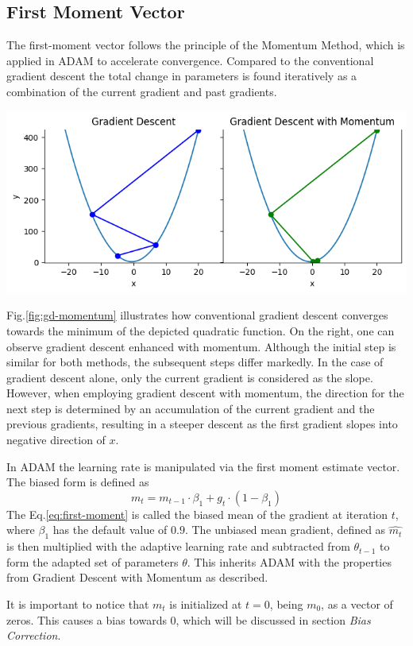 \documentclass[oneside]{article}
\begin{document}
\subsection{First Moment Vector}
The first-moment vector follows the principle of the Momentum Method, which is applied in ADAM to accelerate convergence. Compared to the conventional gradient descent the total change in parameters is found iteratively as a combination of the current gradient and past gradients.\par
\begin{center}
    \includegraphics[width=1\textwidth]{report/figures/GD_momentum.png}
    \label{fig:gd-momentum}
\end{center}
Fig.\ref{fig:gd-momentum} illustrates how conventional gradient descent converges towards the minimum of the depicted quadratic function. On the right, one can observe gradient descent enhanced with momentum. Although the initial step is similar for both methods, the subsequent steps differ markedly. In the case of gradient descent alone, only the current gradient is considered as the slope. However, when employing gradient descent with momentum, the direction for the next step is determined by an accumulation of the current gradient and the previous gradients, resulting in a steeper descent as the first gradient slopes into negative direction of $x$.\par
In ADAM the learning rate is manipulated via the first moment estimate vector. The biased form is defined as 
\begin{equation}
    m_t=m_{t-1}\cdot \beta_1 + g_t\cdot (1-\beta_1)
    \label{eq:first-moment}
\end{equation}
The Eq.\ref{eq:first-moment} is called the biased mean of the gradient at iteration $t$, where $\beta_1$ has the default value of $0.9$. The unbiased mean gradient, defined as $\hat{m_t}$ is then multiplied with the adaptive learning rate and subtracted from $\theta_{t-1}$ to form the adapted set of parameters $\theta$. This inherits ADAM with the properties from Gradient Descent with Momentum as described.\par
It is important to notice that $m_t$ is initialized at $t=0$, being $m_0$, as a vector of zeros. This causes a bias towards $0$, which will be discussed in section \textit{Bias Correction}.
\end{document}
